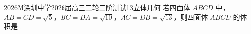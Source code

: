
\begin{problem}{2026}{M}{深圳中学2026届高三二轮二阶测试}{13}{立体几何}
若四面体 $ABCD$ 中，$AB=CD=\sqrt{5}$，$BC=DA=\sqrt{10}$，$AC=DB=\sqrt{13}$，则四面体 $ABCD$ 的体积是 \underline{\hspace{4em}}.
\end{problem}